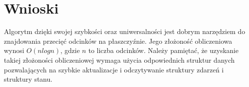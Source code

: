 \documentclass[11pt]{scrartcl}
\begin{document}
    \section{Wnioski}
    Algorytm dzięki swojej szybkości oraz uniwersalności jest dobrym narzędziem
    do znajdowania przecięć odcinków na płaszczyźnie. Jego złożoność obliczeniowa
    wynosi $O(nlogn)$, gdzie $n$ to liczba odcinków. Należy pamiętać, że uzyskanie
    takiej złożoności obliczeniowej wymaga użycia odpowiednich struktur danych
    pozwalających na szybkie aktualizacje i odczytywanie struktury zdarzeń
    i struktury stanu.
\end{document}
